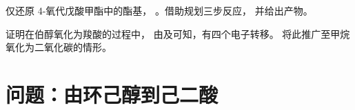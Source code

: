 \begin{exercise}[$\star\star\star$]\label{exo:b1:organic-redox:11}
仅还原 4-氧代戊酸甲酯中的酯基，
。借助规划三步反应，
并给出产物。
\end{exercise}

\begin{exercise}[$\star\star\star$]\label{exo:b1:organic-redox:12}
证明在伯醇氧化为羧酸的过程中，
由及可知，有四个电子转移。
将此推广至甲烷氧化为二氧化碳的情形。
\end{exercise}

\section{问题：由环己醇到己二酸}

